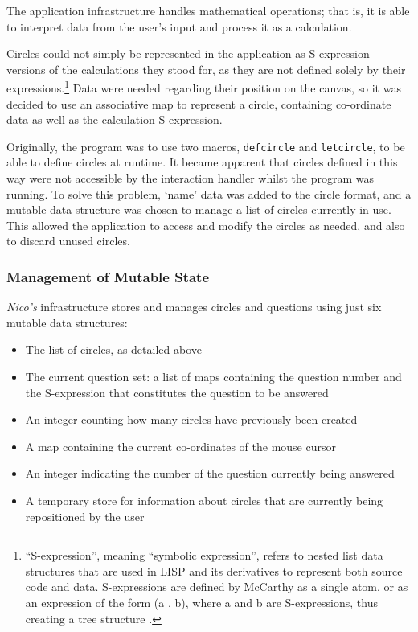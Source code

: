 \documentclass[12pt,twoside,notitlepage,xetex]{report}
\begin{document}
The application infrastructure handles mathematical operations; that is, it is able to interpret data from the user's input and process it as a calculation.

Circles could not simply be represented in the application as S-expression versions of the calculations they stood for, as they are not defined solely by their expressions.\footnote{``S-expression'', meaning ``symbolic expression'', refers to nested list data structures that are used in LISP and its derivatives to represent both source code and data.  S-expressions are defined by McCarthy as a single atom, or as an expression of the form {\ttfamily (a . b)}, where {\ttfamily a} and {\ttfamily b} are S-expressions, thus creating a tree structure \cite{McCarthy1960}.}  Data were needed regarding their position on the canvas, so it was decided to use an associative map to represent a circle, containing co-ordinate data as well as the calculation S-expression.

Originally, the program was to use two macros, \verb¬defcircle¬ and \verb¬letcircle¬, to be able to define circles at runtime.  It became apparent that circles defined in this way were not accessible by the interaction handler whilst the program was running.  To solve this problem, `name' data was added to the circle format, and a mutable data structure was chosen to manage a list of circles currently in use.  This allowed the application to access and modify the circles as needed, and also to discard unused circles.

\subsubsection{Management of Mutable State}

\emph{Nico's} infrastructure stores and manages circles and questions using just six mutable data structures:
\begin{itemize}
\item The list of circles, as detailed above
\item The current question set: a list of maps containing the question number and the S-expression that constitutes the question to be answered
\item An integer counting how many circles have previously been created
\item A map containing the current co-ordinates of the mouse cursor
\item An integer indicating the number of the question currently being answered
\item A temporary store for information about circles that are currently being repositioned by the user
\end{itemize}
\end{document}
